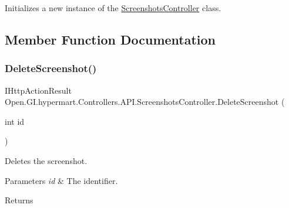 Initializes a new instance of the \hyperlink{class_open_1_1_g_i_1_1hypermart_1_1_controllers_1_1_a_p_i_1_1_screenshots_controller}{Screenshots\+Controller} class. 



\subsection{Member Function Documentation}
\hypertarget{class_open_1_1_g_i_1_1hypermart_1_1_controllers_1_1_a_p_i_1_1_screenshots_controller_a85094c9aa969d9d3fc2a746847eef6e8}{}\label{class_open_1_1_g_i_1_1hypermart_1_1_controllers_1_1_a_p_i_1_1_screenshots_controller_a85094c9aa969d9d3fc2a746847eef6e8} 
\subsubsection{\texorpdfstring{Delete\+Screenshot()}{DeleteScreenshot()}}
{\footnotesize\ttfamily I\+Http\+Action\+Result Open.\+G\+I.\+hypermart.\+Controllers.\+A\+P\+I.\+Screenshots\+Controller.\+Delete\+Screenshot (\begin{DoxyParamCaption}\item[{int}]{id }\end{DoxyParamCaption})}



Deletes the screenshot. 


\begin{DoxyParams}{Parameters}
{\em id} & The identifier.\\
\hline
\end{DoxyParams}
\begin{DoxyReturn}{Returns}

\end{DoxyReturn}
\hypertarget{class_open_1_1_g_i_1_1hypermart_1_1_controllers_1_1_a_p_i_1_1_screenshots_controller_a63f56d0cc46aa71b08e2360e242af42d}{}\label{class_open_1_1_g_i_1_1hypermart_1_1_controllers_1_1_a_p_i_1_1_screenshots_controller_a63f56d0cc46aa71b08e2360e242af42d} 
